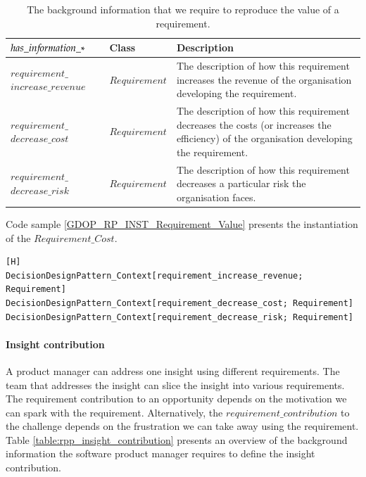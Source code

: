 \begin{table}[H]
\centering
\caption{The background information that we require to reproduce the value of a requirement.}
\begin{tabular}{| p{3cm} | p{2.5cm} | p{9.5cm} | }
\hline
\rowcolor{document}
\color{documentText}$has\_in{\mkern-2mu f\mkern-3mu}ormation\_*$ & \color{documentText}Class & \color{documentText}Description  \\
\hline
$requirement\_$ $increase\_revenue$ & $Requirement$ & The description of how this requirement increases the revenue of the organisation developing the requirement. \\ 
\hdashline
$requirement\_$ $decrease\_cost$ & $Requirement$ & The description of how this requirement decreases the costs (or increases the efficiency) of the organisation developing the requirement. \\ 
\hdashline
$requirement\_$ $decrease\_risk$ & $Requirement$ & The description of how this requirement decreases a particular risk the organisation faces. \\ 
\hline
\end{tabular}
\label{table:rpp_requirement_value}
\end{table}

Code sample \ref{GDOP_RP_INST_Requirement_Value} presents the instantiation of the $Requirement\_Cost$. 

\begin{lstlisting}[float,language=GDOL,caption={The GDOL instantiation code of the information reproducing the $Requirement\_Value$},label={GDOP_RP_INST_Requirement_Value}][H]
DecisionDesignPattern_Context[requirement_increase_revenue; Requirement] 
DecisionDesignPattern_Context[requirement_decrease_cost; Requirement]
DecisionDesignPattern_Context[requirement_decrease_risk; Requirement]
\end{lstlisting}

\paragraph{Insight contribution}
A product manager can address one insight using different requirements. The team that addresses the insight can slice the insight into various requirements. The requirement contribution to an opportunity depends on the motivation we can spark with the requirement. Alternatively, the $requirement\_contribution$ to the challenge depends on the frustration we can take away using the requirement. Table \ref{table:rpp_insight_contribution} presents an overview of the background information the software product manager requires to define the insight contribution.

